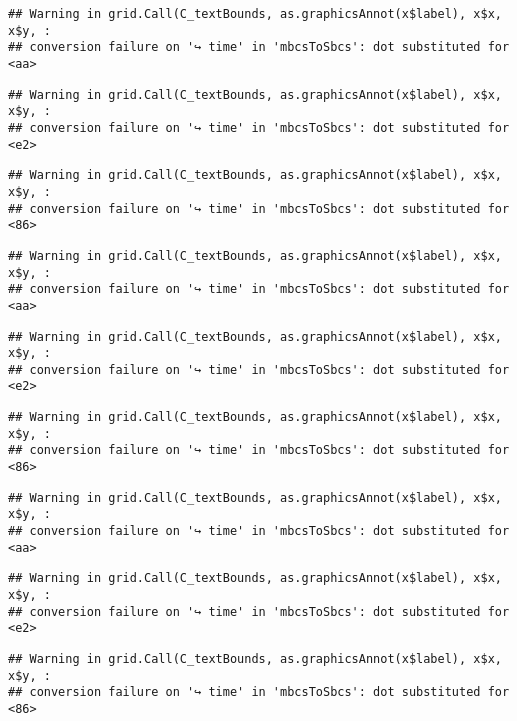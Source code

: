 \documentclass[
]{article}
\begin{document}
\begin{verbatim}
## Warning in grid.Call(C_textBounds, as.graphicsAnnot(x$label), x$x, x$y, :
## conversion failure on '↪ time' in 'mbcsToSbcs': dot substituted for <aa>
\end{verbatim}

\begin{verbatim}
## Warning in grid.Call(C_textBounds, as.graphicsAnnot(x$label), x$x, x$y, :
## conversion failure on '↪ time' in 'mbcsToSbcs': dot substituted for <e2>
\end{verbatim}

\begin{verbatim}
## Warning in grid.Call(C_textBounds, as.graphicsAnnot(x$label), x$x, x$y, :
## conversion failure on '↪ time' in 'mbcsToSbcs': dot substituted for <86>
\end{verbatim}

\begin{verbatim}
## Warning in grid.Call(C_textBounds, as.graphicsAnnot(x$label), x$x, x$y, :
## conversion failure on '↪ time' in 'mbcsToSbcs': dot substituted for <aa>
\end{verbatim}

\begin{verbatim}
## Warning in grid.Call(C_textBounds, as.graphicsAnnot(x$label), x$x, x$y, :
## conversion failure on '↪ time' in 'mbcsToSbcs': dot substituted for <e2>
\end{verbatim}

\begin{verbatim}
## Warning in grid.Call(C_textBounds, as.graphicsAnnot(x$label), x$x, x$y, :
## conversion failure on '↪ time' in 'mbcsToSbcs': dot substituted for <86>
\end{verbatim}

\begin{verbatim}
## Warning in grid.Call(C_textBounds, as.graphicsAnnot(x$label), x$x, x$y, :
## conversion failure on '↪ time' in 'mbcsToSbcs': dot substituted for <aa>
\end{verbatim}

\begin{verbatim}
## Warning in grid.Call(C_textBounds, as.graphicsAnnot(x$label), x$x, x$y, :
## conversion failure on '↪ time' in 'mbcsToSbcs': dot substituted for <e2>
\end{verbatim}

\begin{verbatim}
## Warning in grid.Call(C_textBounds, as.graphicsAnnot(x$label), x$x, x$y, :
## conversion failure on '↪ time' in 'mbcsToSbcs': dot substituted for <86>
\end{verbatim}
\end{document}
